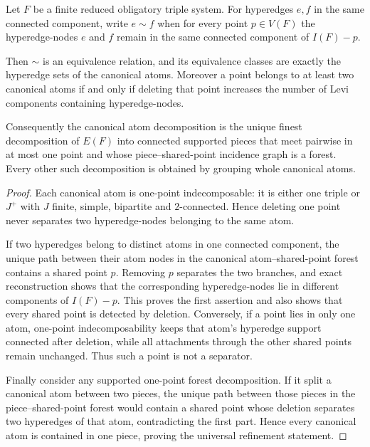 
\begin{proposition}
\label{proposition-universal-canonical-one-point-factorization}
Let $F$ be a finite reduced obligatory triple system.  For hyperedges $e,f$
in the same connected component, write $e\sim f$ when for every point
$p\in V(F)$ the hyperedge-nodes $e$ and $f$ remain in the same connected
component of $I(F)-p$.

Then $\sim$ is an equivalence relation, and its equivalence classes are
exactly the hyperedge sets of the canonical atoms.  Moreover a point belongs
to at least two canonical atoms if and only if deleting that point increases
the number of Levi components containing hyperedge-nodes.

Consequently the canonical atom decomposition is the unique finest
decomposition of $E(F)$ into connected supported pieces that meet pairwise in
at most one point and whose piece--shared-point incidence graph is a forest.
Every other such decomposition is obtained by grouping whole canonical atoms.
\end{proposition}

\begin{proof}
Each canonical atom is one-point indecomposable: it is either one triple or
$J^+$ with $J$ finite, simple, bipartite and $2$-connected.  Hence deleting one
point never separates two hyperedge-nodes belonging to the same atom.

If two hyperedges belong to distinct atoms in one connected component, the
unique path between their atom nodes in the canonical atom--shared-point
forest contains a shared point $p$.  Removing $p$ separates the two branches,
and exact reconstruction shows that the corresponding hyperedge-nodes lie in
different components of $I(F)-p$.  This proves the first assertion and also
shows that every shared point is detected by deletion.  Conversely, if a
point lies in only one atom, one-point indecomposability keeps that atom's
hyperedge support connected after deletion, while all attachments through the
other shared points remain unchanged.  Thus such a point is not a separator.

Finally consider any supported one-point forest decomposition.  If it split a
canonical atom between two pieces, the unique path between those pieces in the
piece--shared-point forest would contain a shared point whose deletion
separates two hyperedges of that atom, contradicting the first part.  Hence
every canonical atom is contained in one piece, proving the universal
refinement statement.
\end{proof}

